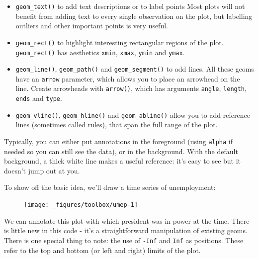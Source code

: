 \begin{itemize}
\item
  \texttt{geom\_text()} to add text descriptions or to label points Most
  plots will not benefit from adding text to every single observation on
  the plot, but labelling outliers and other important points is very
  useful.  
\item
  \texttt{geom\_rect()} to highlight interesting rectangular regions of
  the plot. \texttt{geom\_rect()} has aesthetics \texttt{xmin},
  \texttt{xmax}, \texttt{ymin} and \texttt{ymax}. 
\item
  \texttt{geom\_line()}, \texttt{geom\_path()} and
  \texttt{geom\_segment()} to add lines. All these geoms have an
  \texttt{arrow} parameter, which allows you to place an arrowhead on
  the line. Create arrowheads with \texttt{arrow()}, which has arguments
  \texttt{angle}, \texttt{length}, \texttt{ends} and \texttt{type}.
\item
  \texttt{geom\_vline()}, \texttt{geom\_hline()} and
  \texttt{geom\_abline()} allow you to add reference lines (sometimes
  called rules), that span the full range of the plot.
    
\end{itemize}

Typically, you can either put annotations in the foreground (using
\texttt{alpha} if needed so you can still see the data), or in the
background. With the default background, a thick white line makes a
useful reference: it's easy to see but it doesn't jump out at you.

To show off the basic idea, we'll draw a time series of unemployment:

\begin{Shaded}
\begin{Highlighting}[]
\StringTok{ }
\StringTok{  }\NormalTok{()}
\end{Highlighting}
\end{Shaded}

\begin{figure}[H]
  \texttt{[image: \_figures/toolbox/umep-1]}
\end{figure}

We can annotate this plot with which president was in power at the time.
There is little new in this code - it's a straightforward manipulation
of existing geoms. There is one special thing to note: the use of
\texttt{-Inf} and \texttt{Inf} as positions. These refer to the top and
bottom (or left and right) limits of the plot. 

